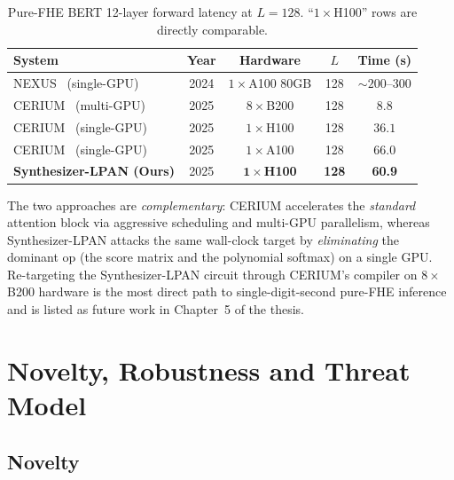 \documentclass[11pt,a4paper]{article}
\begin{document}
\begin{table}[h]
\centering
\caption{Pure-FHE BERT 12-layer forward latency at $L=128$.
``$1\times$H100'' rows are directly comparable.}
\label{tab:sota}
\begin{tabular}{lcccc}
\toprule
\textbf{System} & \textbf{Year} & \textbf{Hardware} & \textbf{$L$} &
\textbf{Time (s)} \\
\midrule
NEXUS~\cite{zhang2024nexus} (single-GPU)        & 2024 & $1\times$A100 80GB & 128 & $\sim200$--$300$ \\
CERIUM~\cite{cerium2025} (multi-GPU)            & 2025 & $8\times$B200       & 128 & $8.8$ \\
CERIUM~\cite{cerium2025} (single-GPU)           & 2025 & $1\times$H100       & 128 & $36.1$ \\
CERIUM~\cite{cerium2025} (single-GPU)           & 2025 & $1\times$A100       & 128 & $66.0$ \\
\textbf{Synthesizer-LPAN (Ours)}                & 2025 & $\mathbf{1\times}$\textbf{H100}
                                                                                          & \textbf{128} & \textbf{60.9} \\
\bottomrule
\end{tabular}
\end{table}

The two approaches are \emph{complementary}: CERIUM accelerates the
\emph{standard} attention block via aggressive scheduling and multi-GPU
parallelism, whereas Synthesizer-LPAN attacks the same wall-clock
target by \emph{eliminating} the dominant op (the score matrix and the
polynomial softmax) on a single GPU.  Re-targeting the
Synthesizer-LPAN circuit through CERIUM's compiler on $8\times$B200
hardware is the most direct path to single-digit-second pure-FHE
inference and is listed as future work in Chapter~5 of the thesis.

\section{Novelty, Robustness and Threat Model}

\subsection*{Novelty}
\end{document}
